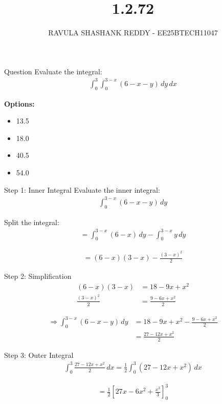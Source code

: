 \documentclass{beamer}
\title{1.2.72}
\author{RAVULA SHASHANK REDDY - EE25BTECH11047}
\date{}
\begin{document}
\frame{\titlepage}

\begin{frame}{Question}
Evaluate the integral:
\begin{align}
\int_{0}^{3} \int_{0}^{3-x} (6 - x - y)\, dy\, dx
\end{align}

\textbf{Options:}
\begin{itemize}
\item[(a)] 13.5
\item[(b)] 18.0
\item[(c)] 40.5
\item[(d)] 54.0
\end{itemize}
\end{frame}


\begin{frame}{Step 1: Inner Integral}
Evaluate the inner integral:
\begin{align}
\int_{0}^{3-x} (6 - x - y)\, dy
\end{align}

Split the integral:
\begin{align}
= \int_{0}^{3-x} (6 - x)\, dy - \int_{0}^{3-x} y\, dy
\end{align}

\begin{align}
= (6 - x)(3 - x) - \frac{(3 - x)^2}{2}
\end{align}
\end{frame}


\begin{frame}{Step 2: Simplification}
\begin{align}
(6 - x)(3 - x) &= 18 - 9x + x^2 \\
\frac{(3 - x)^2}{2} &= \frac{9 - 6x + x^2}{2}
\end{align}

\begin{align}
\Rightarrow \int_{0}^{3-x} (6 - x - y)\, dy
&= 18 - 9x + x^2 - \frac{9 - 6x + x^2}{2} \\
&= \frac{27 - 12x + x^2}{2}
\end{align}
\end{frame}


\begin{frame}{Step 3: Outer Integral}
\begin{align}
\int_{0}^{3} \frac{27 - 12x + x^2}{2} \, dx
= \frac{1}{2} \int_{0}^{3} (27 - 12x + x^2)\, dx
\end{align}

\begin{align}
= \frac{1}{2} \left[ 27x - 6x^2 + \frac{x^3}{3} \right]_{0}^{3}
\end{align}
\end{frame}
\end{document}
